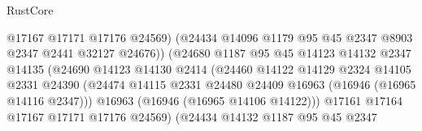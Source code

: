 \begin{lexlean}{RustCore}
\begin{coremodule}
                                        @17167
                                        @17171
                                        @17176
                                        @24569)
                                      (@24434
                                        @14096
                                        @1179
                                        @95
                                        @45
                                        @2347
                                        @8903
                                        @2347
                                        @2441
                                        @32127
                                        @24676))
                                    (@24680
                                      @1187
                                      @95
                                      @45
                                      @14123
                                      @14132
                                      @2347
                                      @14135
                                      (@24690
                                        @14123
                                        @14130
                                        @2414
                                        (@24460
                                          @14122
                                          @14129
                                          @2324
                                          @14105
                                          @2331
                                          @24390
                                          (@24474
                                            @14115
                                            @2331
                                            @24480
                                            @24409
                                            @16963
                                            (@16946 (@16965 @14116 @2347)))
                                          @16963
                                          (@16946 (@16965 @14106 @14122)))
                                        @17161
                                        @17164
                                        @17167
                                        @17171
                                        @17176
                                        @24569)
                                      (@24434
                                        @14132
                                        @1187
                                        @95
                                        @45
                                        @2347

\end{coremodule}
\end{lexlean}
